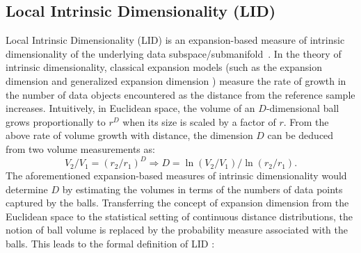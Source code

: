 \documentclass{article}
\begin{document}
\subsection{Local Intrinsic Dimensionality (LID)}
Local Intrinsic Dimensionality (LID) is an expansion-based measure of intrinsic dimensionality of the underlying data subspace/submanifold~\cite{houle2017local1}. 
In the theory of intrinsic dimensionality, classical
expansion models (such as the expansion dimension \cite{karger2002finding} and generalized expansion dimension \cite{HouleKN12}) measure the rate of growth in the number of data objects encountered as the distance from the reference sample increases. Intuitively, in Euclidean space, the volume of an $D$-dimensional ball grows proportionally to $r^D$ when its size is scaled by a factor of $r$. From the above rate of volume growth with distance, the dimension $D$ can be deduced from two volume measurements as: 
\begin{equation}
V_2/V_1 = (r_2/r_1)^D \Rightarrow D = \ln(V_2/V_1)/\ln(r_2/r_1).   
\end{equation}
The aforementioned expansion-based measures of intrinsic dimensionality would determine $D$ by estimating the volumes in terms of the numbers of data points captured by the balls. Transferring the concept of expansion dimension from the Euclidean space to the statistical setting of continuous distance distributions, the notion of ball volume is replaced by the probability measure associated with the balls. This leads to the formal definition of LID \cite{houle2017local1}:
\end{document}
